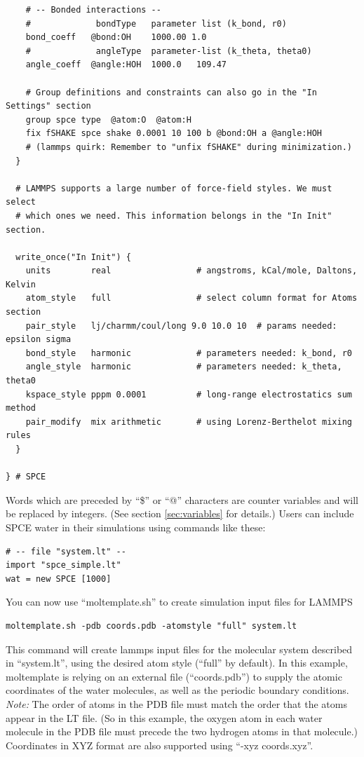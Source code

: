 \documentclass[11pt]{article}
\begin{document}
\begin{verbatim}
    # -- Bonded interactions --
    #             bondType   parameter list (k_bond, r0)
    bond_coeff   @bond:OH    1000.00 1.0 
    #             angleType  parameter-list (k_theta, theta0)
    angle_coeff  @angle:HOH  1000.0   109.47

    # Group definitions and constraints can also go in the "In Settings" section
    group spce type  @atom:O  @atom:H
    fix fSHAKE spce shake 0.0001 10 100 b @bond:OH a @angle:HOH
    # (lammps quirk: Remember to "unfix fSHAKE" during minimization.)
  }

  # LAMMPS supports a large number of force-field styles. We must select
  # which ones we need. This information belongs in the "In Init" section.

  write_once("In Init") {
    units        real                 # angstroms, kCal/mole, Daltons, Kelvin
    atom_style   full                 # select column format for Atoms section
    pair_style   lj/charmm/coul/long 9.0 10.0 10  # params needed: epsilon sigma
    bond_style   harmonic             # parameters needed: k_bond, r0
    angle_style  harmonic             # parameters needed: k_theta, theta0
    kspace_style pppm 0.0001          # long-range electrostatics sum method
    pair_modify  mix arithmetic       # using Lorenz-Berthelot mixing rules
  }

} # SPCE
\end{verbatim}
Words which are preceded by ``\$'' or ``@'' characters 
are counter variables and will be replaced by integers. 
(See section \ref{sec:variables} for details.)
Users can include SPCE water in their simulations using commands like these:
\begin{verbatim}
# -- file "system.lt" --
import "spce_simple.lt"
wat = new SPCE [1000]
\end{verbatim}
You can now use ``moltemplate.sh'' to create simulation input files for LAMMPS
\begin{verbatim}
moltemplate.sh -pdb coords.pdb -atomstyle "full" system.lt
\end{verbatim}
This command will create lammps input files 
for the molecular system described in ``system.lt'',
using the desired atom style (``full'' by default).
In this example, moltemplate is relying on an external file (``coords.pdb'')
to supply the atomic coordinates of the water molecules, as well as
the periodic boundary conditions.  \textit{Note:} The order of atoms in
the PDB file must match the order that the atoms appear in the LT file.
(So in this example, the oxygen atom in each water molecule in the PDB file
 must precede the two hydrogen atoms in that molecule.)
Coordinates in XYZ format are also supported using ``-xyz coords.xyz''. 
\end{document}
